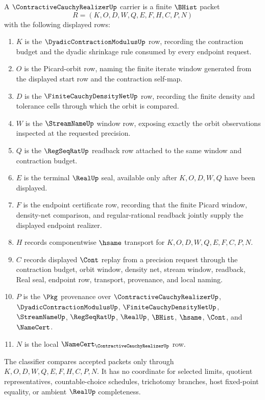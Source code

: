 \begin{definition}
\label{def:contractive-cauchy-realizer-carrier}
A $\ContractiveCauchyRealizerUp$ carrier is a finite $\BHist$ packet
$$
R=(K,O,D,W,Q,E,F,H,C,P,N)
$$
with the following displayed rows:
\begin{enumerate}
\item $K$ is the $\DyadicContractionModulusUp$ row, recording the contraction budget and the dyadic shrinkage rule consumed by every endpoint request.
\item $O$ is the Picard-orbit row, naming the finite iterate window generated from the displayed start row and the contraction self-map.
\item $D$ is the $\FiniteCauchyDensityNetUp$ row, recording the finite density and tolerance cells through which the orbit is compared.
\item $W$ is the $\StreamNameUp$ window row, exposing exactly the orbit observations inspected at the requested precision.
\item $Q$ is the $\RegSeqRatUp$ readback row attached to the same window and contraction budget.
\item $E$ is the terminal $\RealUp$ seal, available only after $K,O,D,W,Q$ have been displayed.
\item $F$ is the endpoint certificate row, recording that the finite Picard window, density-net comparison, and regular-rational readback jointly supply the displayed endpoint realizer.
\item $H$ records componentwise $\hsame$ transport for $K,O,D,W,Q,E,F,C,P,N$.
\item $C$ records displayed $\Cont$ replay from a precision request through the contraction budget, orbit window, density net, stream window, readback, Real seal, endpoint row, transport, provenance, and local naming.
\item $P$ is the $\Pkg$ provenance over $\ContractiveCauchyRealizerUp$, $\DyadicContractionModulusUp$, $\FiniteCauchyDensityNetUp$, $\StreamNameUp$, $\RegSeqRatUp$, $\RealUp$, $\BHist$, $\hsame$, $\Cont$, and $\NameCert$.
\item $N$ is the local $\NameCert_{\ContractiveCauchyRealizerUp}$ row.
\end{enumerate}
The classifier compares accepted packets only through $K,O,D,W,Q,E,F,H,C,P,N$. It has no coordinate for selected limits, quotient representatives, countable-choice schedules, trichotomy branches, host fixed-point equality, or ambient $\RealUp$ completeness.
\end{definition}

